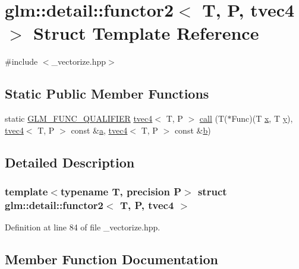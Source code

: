 \hypertarget{structglm_1_1detail_1_1functor2_3_01_t_00_01_p_00_01tvec4_01_4}{}\section{glm\+::detail\+::functor2$<$ T, P, tvec4 $>$ Struct Template Reference}
\label{structglm_1_1detail_1_1functor2_3_01_t_00_01_p_00_01tvec4_01_4}


{\ttfamily \#include $<$\+\_\+vectorize.\+hpp$>$}

\subsection*{Static Public Member Functions}
\begin{DoxyCompactItemize}
\item 
static \mbox{\hyperlink{setup_8hpp_a33fdea6f91c5f834105f7415e2a64407}{G\+L\+M\+\_\+\+F\+U\+N\+C\+\_\+\+Q\+U\+A\+L\+I\+F\+I\+ER}} \mbox{\hyperlink{structglm_1_1tvec4}{tvec4}}$<$ T, P $>$ \mbox{\hyperlink{structglm_1_1detail_1_1functor2_3_01_t_00_01_p_00_01tvec4_01_4_a27fb8a00559c0caa02b7e5892301922f}{call}} (T($\ast$Func)(T \mbox{\hyperlink{glad_8h_a92d0386e5c19fb81ea88c9f99644ab1d}{x}}, T \mbox{\hyperlink{glad_8h_a66ddd433d2cacfe27f5906b7e86faeed}{y}}), \mbox{\hyperlink{structglm_1_1tvec4}{tvec4}}$<$ T, P $>$ const \&\mbox{\hyperlink{glad_8h_ac8729153468b5dcf13f971b21d84d4e5}{a}}, \mbox{\hyperlink{structglm_1_1tvec4}{tvec4}}$<$ T, P $>$ const \&\mbox{\hyperlink{glad_8h_a6eba317e3cf44d6d26c04a5a8f197dcb}{b}})
\end{DoxyCompactItemize}


\subsection{Detailed Description}
\subsubsection*{template$<$typename T, precision P$>$\newline
struct glm\+::detail\+::functor2$<$ T, P, tvec4 $>$}



Definition at line 84 of file \+\_\+vectorize.\+hpp.



\subsection{Member Function Documentation}
\mbox{\label{structglm_1_1detail_1_1functor2_3_01_t_00_01_p_00_01tvec4_01_4_a27fb8a00559c0caa02b7e5892301922f}} 

